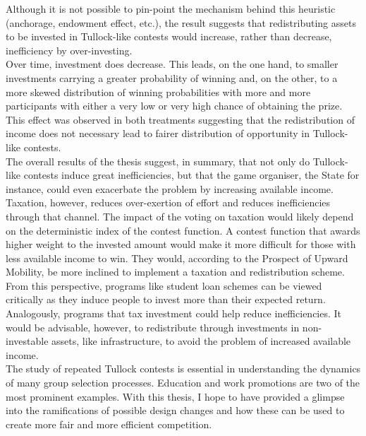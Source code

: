 Although it is not possible to pin-point the mechanism behind this heuristic (anchorage, endowment effect, etc.), the result suggests that redistributing assets to be invested in Tullock-like contests would increase, rather than decrease, inefficiency by over-investing.\\  

Over time, investment does decrease. This leads, on the one hand, to smaller investments carrying a greater probability of winning and, on the other, to a more skewed distribution of winning probabilities with more and more participants with either a very low or very high chance of obtaining the prize. This effect was observed in both treatments suggesting that the redistribution of income does not necessary lead to fairer distribution of opportunity in Tullock-like contests.\\

The overall results of the thesis suggest, in summary, that not only do Tullock-like contests induce great inefficiencies, but that the game organiser, the State for instance, could even exacerbate the problem by increasing available income. Taxation, however, reduces over-exertion of effort and reduces inefficiencies through that channel. The impact of the voting on taxation would likely depend on the deterministic index of the contest function. A contest function that awards higher weight to the invested amount would make it more difficult for those with less available income to win. They would, according to the Prospect of Upward Mobility, be more inclined to implement a taxation and redistribution scheme.\\

From this perspective, programs like student loan schemes can be viewed critically as they induce people to invest more than their expected return. Analogously, programs that tax investment could help reduce inefficiencies. It would be advisable, however, to redistribute through investments in non-investable assets, like infrastructure, to avoid the problem of increased available income.\\

The study of repeated Tullock contests is essential in understanding the dynamics of many group selection processes. Education and work promotions are two of the most prominent examples. With this thesis, I hope to have provided a glimpse into the ramifications of possible design changes and how these can be used to create more fair and more efficient competition.